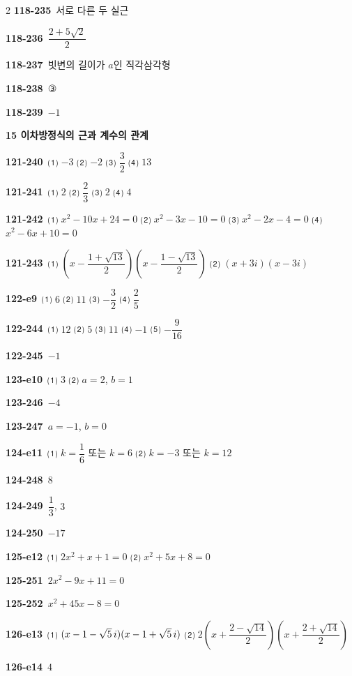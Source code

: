 \documentclass[10pt,a4paper]{article}
\begin{document}
\begin{multicols}{2}
\noindent\textbf{118-235}\ 서로 다른 두 실근\par
\noindent\textbf{118-236}\ $\dfrac{2+5\sqrt{2}}{2}$\par
\noindent\textbf{118-237}\ 빗변의 길이가 $a$인 직각삼각형\par
\noindent\textbf{118-238}\ ③\par
\noindent\textbf{118-239}\ $-1$\par
\noindent\textbf{15 이차방정식의 근과 계수의 관계}\par\smallskip
\noindent\textbf{121-240}\ ⑴ $-3$ \quad ⑵ $-2$ \quad ⑶ $\dfrac{3}{2}$ \quad ⑷ $13$\par
\noindent\textbf{121-241}\ ⑴ $2$ \quad ⑵ $\dfrac{2}{3}$ \quad ⑶ $2$ \quad ⑷ $4$\par
\noindent\textbf{121-242}\ ⑴ $x^2-10x+24=0$ \quad ⑵ $x^2-3x-10=0$ \quad ⑶ $x^2-2x-4=0$ \quad ⑷ $x^2-6x+10=0$\par
\noindent\textbf{121-243}\ ⑴ $\left(x-\dfrac{1+\sqrt{13}}{2}\right)\left(x-\dfrac{1-\sqrt{13}}{2}\right)$ \quad ⑵ $(x+3i)(x-3i)$\par
\noindent\textbf{122-e9}\ ⑴ $6$ \quad ⑵ $11$ \quad ⑶ $-\dfrac{3}{2}$ \quad ⑷ $\dfrac{2}{5}$\par
\noindent\textbf{122-244}\ ⑴ $12$ \quad ⑵ $5$ \quad ⑶ $11$ \quad ⑷ $-1$ \quad ⑸ $-\dfrac{9}{16}$\par
\noindent\textbf{122-245}\ $-1$\par
\noindent\textbf{123-e10}\ ⑴ $3$ \quad ⑵ $a=2$, $b=1$\par
\noindent\textbf{123-246}\ $-4$\par
\noindent\textbf{123-247}\ $a=-1$, $b=0$\par
\noindent\textbf{124-e11}\ ⑴ $k=\dfrac{1}{6}$ 또는 $k=6$ \quad ⑵ $k=-3$ 또는 $k=12$\par
\noindent\textbf{124-248}\ $8$\par
\noindent\textbf{124-249}\ $\dfrac{1}{3}$, $3$\par
\noindent\textbf{124-250}\ $-17$\par
\noindent\textbf{125-e12}\ ⑴ $2x^2+x+1=0$ \quad ⑵ $x^2+5x+8=0$\par
\noindent\textbf{125-251}\ $2x^2-9x+11=0$\par
\noindent\textbf{125-252}\ $x^2+45x-8=0$\par
\noindent\textbf{126-e13}\ ⑴ $(x-1-\sqrt{5}\mkern3mu i)(x-1+\sqrt{5}\mkern3mu i)$ \quad ⑵ $2\left(x+\dfrac{2-\sqrt{14}}{2}\right)\left(x+\dfrac{2+\sqrt{14}}{2}\right)$\par
\noindent\textbf{126-e14}\ $4$\par

\end{multicols}
\end{document}
